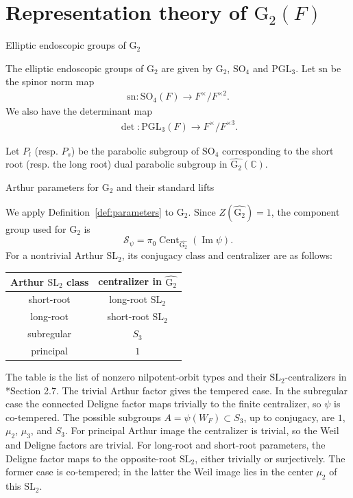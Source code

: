 \documentclass[12pt]{amsart}
\makeatletter
\renewcommand{\subsection}{\@startsection{subsection}{2}%
  \z@{.7\linespacing\@plus.5\linespacing}{.35\linespacing}%
  {\normalfont\bfseries\raggedright}}
\theoremstyle{definition}
\theoremstyle{plain}
\theoremstyle{remark}
\def\C{\mathbb{C}}%
\def\PGL{\mathrm{PGL}}
\def\SL{\mathrm{SL}}
\def\SO{\mathrm{SO}}
\DeclareMathOperator{\Cent}{Cent}%
\newcommand{\cS}{\mathcal{S}}
\numberwithin{equation}{section}
\newcommand{\rG}{\mathrm{G}}
\newcommand{\sn}{\mathrm{sn}}
\makeatother
\begin{document}
\section{Representation theory of $\rG_2(F)$}

\subsection{Elliptic endoscopic groups of $\rG_2$}\label{subsec:elliptic-endoscopic-groups}

The elliptic endoscopic groups of $\rG_2$ are  given by $\rG_2$, $\SO_4$ and $\PGL_3$.
Let $\sn$ be the spinor norm map 
\begin{align}
     \sn \colon \SO_4(F) \to F^\times / F^{\times 2}.
\end{align}
We also have the determinant map
\begin{align}
      \det \colon \PGL_3(F) \to F^\times / F^{\times 3}.
\end{align}

Let $P_l$ (resp. $P_s$) be the parabolic subgroup of $\SO_4$ corresponding to the short root (resp. the long root) dual parabolic subgroup in $\widehat{\rG_2}(\C)$.

\subsection{\texorpdfstring{Arthur parameters for $\rG_2$ and their standard lifts}{Arthur parameters for G2 and their standard lifts}}\label{subsec:G2-parameters}

We apply Definition~\ref{def:parameters} to $\rG_2$.
Since $Z(\widehat{\rG_2})=1$, the component group used for ${\rG_2}$ is
\[
 \cS_\psi=\pi_0\Cent_{\widehat{\rG_2}}(\operatorname{Im}\psi).
\]
For a nontrivial Arthur $\SL_2$, its conjugacy class and centralizer
are as follows:
\begin{center}
\begin{tabular}{c|c}
Arthur $\SL_2$ class & centralizer in $\widehat{\rG_2}$\\ \hline
short-root & long-root $\SL_2$\\
long-root & short-root $\SL_2$\\
subregular & $S_3$\\
principal & $1$
\end{tabular}
\end{center}
The table is the list of nonzero nilpotent-orbit types and their
$\SL_2$-centralizers in
\cite{GanSavin2023-HoweDualityDichotomyExceptionalThetaCorrespondences}*{Section 2.7}.
The trivial Arthur factor gives the tempered case. In the subregular
case the connected Deligne factor maps trivially to the finite
centralizer, so $\psi$ is co-tempered. The possible subgroups
$A=\psi(W_F)\subset S_3$, up to conjugacy, are
$1$, $\mu_2$, $\mu_3$, and $S_3$.
For principal Arthur image the centralizer is trivial, so the Weil
and Deligne factors are trivial. 
For long-root and short-root parameters, the Deligne factor maps to the opposite-root $\SL_2$, either trivially or surjectively. 
The former case is co-tempered; in the latter the Weil image lies in the center $\mu_2$ of this $\SL_2$. 
\end{document}
